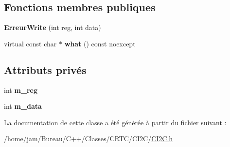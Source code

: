 \subsection*{Fonctions membres publiques}
\begin{DoxyCompactItemize}
\item 
\hypertarget{classCI2C_1_1ErreurWrite_a8d3b2f6b46d6bb5e4b26e5fdce8e80b4}{{\bfseries Erreur\+Write} (int reg, int data)}\label{classCI2C_1_1ErreurWrite_a8d3b2f6b46d6bb5e4b26e5fdce8e80b4}

\item 
\hypertarget{classCI2C_1_1ErreurWrite_ad76aa069d233146923c4a244d2da9665}{virtual const char $\ast$ {\bfseries what} () const noexcept}\label{classCI2C_1_1ErreurWrite_ad76aa069d233146923c4a244d2da9665}

\end{DoxyCompactItemize}
\subsection*{Attributs privés}
\begin{DoxyCompactItemize}
\item 
\hypertarget{classCI2C_1_1ErreurWrite_a0271678b0343dd18ad8113ab3dd579d2}{int {\bfseries m\+\_\+reg}}\label{classCI2C_1_1ErreurWrite_a0271678b0343dd18ad8113ab3dd579d2}

\item 
\hypertarget{classCI2C_1_1ErreurWrite_a3ba1d239d00892177274b494e987862b}{int {\bfseries m\+\_\+data}}\label{classCI2C_1_1ErreurWrite_a3ba1d239d00892177274b494e987862b}

\end{DoxyCompactItemize}


La documentation de cette classe a été générée à partir du fichier suivant \+:\begin{DoxyCompactItemize}
\item 
/home/jam/\+Bureau/\+C++/\+Classes/\+C\+R\+T\+C/\+C\+I2\+C/\hyperlink{CI2C_8h}{C\+I2\+C.\+h}\end{DoxyCompactItemize}
